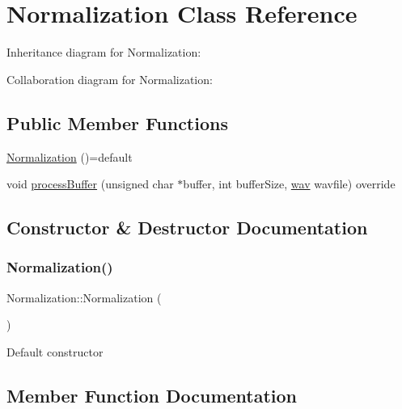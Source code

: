 \hypertarget{classNormalization}{}\section{Normalization Class Reference}
\label{classNormalization}


Inheritance diagram for Normalization\+:


Collaboration diagram for Normalization\+:
\subsection*{Public Member Functions}
\begin{DoxyCompactItemize}
\item 
\hyperlink{classNormalization_a724a3e8f4a639c5a387e16cfc1283312}{Normalization} ()=default
\item 
void \hyperlink{classNormalization_ae2dd53014ffd6a1c197036587c9b8118}{process\+Buffer} (unsigned char $\ast$buffer, int buffer\+Size, \hyperlink{classwav}{wav} wavfile) override
\end{DoxyCompactItemize}


\subsection{Constructor \& Destructor Documentation}
\mbox{\label{classNormalization_a724a3e8f4a639c5a387e16cfc1283312}} 
\subsubsection{\texorpdfstring{Normalization()}{Normalization()}}
{\footnotesize\ttfamily Normalization\+::\+Normalization (\begin{DoxyParamCaption}{ }\end{DoxyParamCaption})\hspace{0.3cm}{\ttfamily [default]}}

Default constructor 

\subsection{Member Function Documentation}
\mbox{\label{classNormalization_ae2dd53014ffd6a1c197036587c9b8118}} 
